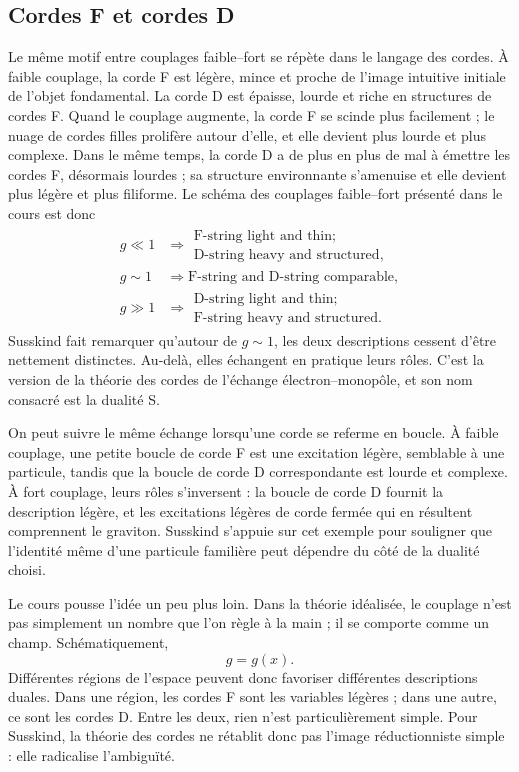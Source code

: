 \subsection{Cordes F et cordes D}

Le même motif entre couplages faible--fort se répète dans le langage des cordes. À faible couplage, la corde F est légère, mince et proche de l’image intuitive initiale de l’objet fondamental. La corde D est épaisse, lourde et riche en structures de cordes F. Quand le couplage augmente, la corde F se scinde plus facilement ; le nuage de cordes filles prolifère autour d’elle, et elle devient plus lourde et plus complexe. Dans le même temps, la corde D a de plus en plus de mal à émettre les cordes F, désormais lourdes ; sa structure environnante s’amenuise et elle devient plus légère et plus filiforme. Le schéma des couplages faible--fort présenté dans le cours est donc
\begin{align}
g \ll 1
&\Rightarrow
\begin{gathered}
\text{F-string light and thin;}\\
\text{D-string heavy and structured},
\end{gathered}\\
g \sim 1
&\Rightarrow
\text{F-string and D-string comparable},\\
g \gg 1
&\Rightarrow
\begin{gathered}
\text{D-string light and thin;}\\
\text{F-string heavy and structured}.
\end{gathered}
\end{align}
Susskind fait remarquer qu’autour de \(g\sim 1\), les deux descriptions cessent d’être nettement distinctes. Au-delà, elles échangent en pratique leurs rôles. C’est la version de la théorie des cordes de l’échange électron--monopôle, et son nom consacré est la dualité S.

On peut suivre le même échange lorsqu’une corde se referme en boucle. À faible couplage, une petite boucle de corde F est une excitation légère, semblable à une particule, tandis que la boucle de corde D correspondante est lourde et complexe. À fort couplage, leurs rôles s’inversent : la boucle de corde D fournit la description légère, et les excitations légères de corde fermée qui en résultent comprennent le graviton. Susskind s’appuie sur cet exemple pour souligner que l’identité même d’une particule familière peut dépendre du côté de la dualité choisi.

Le cours pousse l’idée un peu plus loin. Dans la théorie idéalisée, le couplage n’est pas simplement un nombre que l’on règle à la main ; il se comporte comme un champ. Schématiquement,
\begin{equation}
g = g(x).
\end{equation}
Différentes régions de l’espace peuvent donc favoriser différentes descriptions duales. Dans une région, les cordes F sont les variables légères ; dans une autre, ce sont les cordes D. Entre les deux, rien n’est particulièrement simple. Pour Susskind, la théorie des cordes ne rétablit donc pas l’image réductionniste simple : elle radicalise l’ambiguïté.

